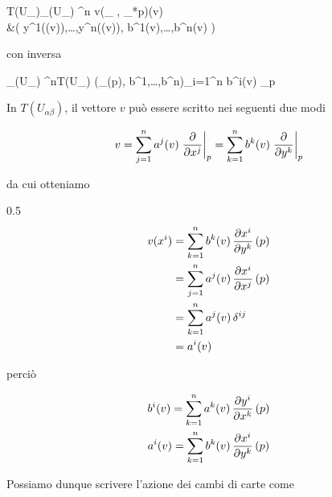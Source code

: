 \map{\tilde{\varphi}_{\beta}}
	{T(U_{\beta})}{\varphi_{\beta}(U_{\beta}) \times \R^{n}}
	{v}{(\varphi_{\beta} \circ \pi, \varphi_{*p})(v) \\
		&\mapsto \left( y^{1}(\pi(v)),\dots,y^{n}(\pi(v)), b^{1}(v),\dots,b^{n}(v) \right)}

con inversa

	{\varphi_{\beta}(U_{\beta}) \times \R^{n}}{T(U_{\beta})}
	{(\varphi_{\beta}(p), b^{1},\dots,b^{n})}{\sum_{i=1}^{n} b^{i}(v) _{p}}

In $ T(U_{\alpha \beta}) $, il vettore $ v $ può essere scritto nei seguenti due modi

\begin{equation}
	v = \sum_{j=1}^{n} a^{j}(v) \eval{ \pdv{x^{j}} }_{p} = %
	\sum_{k=1}^{n} b^{k}(v) \eval{ \pdv{y^{k}} }_{p}
\end{equation}

da cui otteniamo

	{0.5}{%
			\begin{align}
				\begin{split}
					v(x^{i}) &= \sum_{k=1}^{n} b^{k}(v) \, \pdv{x^{i}}{y^{k}} \, (p) \\
					&= \sum_{j=1}^{n} a^{j}(v) \, \pdv{x^{i}}{x^{j}} \, (p) \\
					&= \sum_{k=1}^{n} a^{j}(v) \, \delta^{ij} \\
					&= a^{i}(v)
				\end{split}
			\end{align}
			}

perciò

\begin{gather}
		b^{i}(v) = \sum_{k=1}^{n} a^{k}(v) \, \pdv{y^{i}}{x^{k}} \, (p) \\
		a^{i}(v) = \sum_{k=1}^{n} b^{k}(v) \, \pdv{x^{i}}{y^{k}} \, (p)
\end{gather}

Possiamo dunque scrivere l'azione dei cambi di carte come

